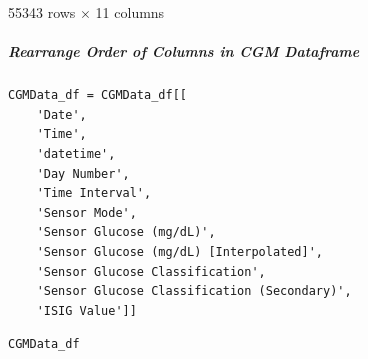 \bigskip

55343 rows $\times$ 11 columns

\subparagraph{Rearrange Order of Columns in CGM Dataframe}

\begin{verbatim}
CGMData_df = CGMData_df[[
    'Date', 
    'Time', 
    'datetime', 
    'Day Number', 
    'Time Interval', 
    'Sensor Mode', 
    'Sensor Glucose (mg/dL)', 
    'Sensor Glucose (mg/dL) [Interpolated]',
    'Sensor Glucose Classification',
    'Sensor Glucose Classification (Secondary)',
    'ISIG Value']]
\end{verbatim}

\begin{verbatim}
CGMData_df
\end{verbatim}

\bigskip\noindent
